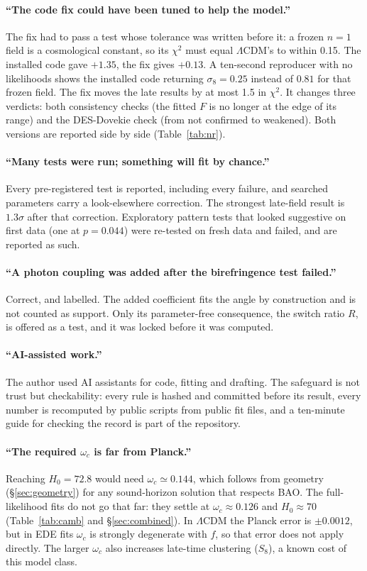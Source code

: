 \documentclass[11pt]{article}
\begin{document}
\paragraph{``The code fix could have been tuned to help the model.''} The fix had to pass a test whose tolerance was
written before it: a frozen $n=1$ field is a cosmological constant, so its $\chi^2$ must equal $\Lambda$CDM's to within
0.15. The installed code gave $+1.35$, the fix gives $+0.13$. A ten-second reproducer with no likelihoods shows the
installed code returning $\sigma_8=0.25$ instead of $0.81$ for that frozen field. The fix moves the late results by at
most 1.5 in $\chi^2$. It changes three verdicts: both consistency checks (the fitted $F$ is no longer at the edge of
its range) and the DES-Dovekie check (from not confirmed to weakened). Both versions are reported side by side
(Table~\ref{tab:nr}).

\paragraph{``Many tests were run; something will fit by chance.''} Every pre-registered test is reported, including
every failure, and searched parameters carry a look-elsewhere correction. The strongest late-field result is
$1.3\sigma$ after that correction. Exploratory pattern tests that looked suggestive on first data (one at $p=0.044$)
were re-tested on fresh data and failed, and are reported as such.

\paragraph{``A photon coupling was added after the birefringence test failed.''} Correct, and labelled. The added
coefficient fits the angle by construction and is not counted as support. Only its parameter-free consequence, the
switch ratio $R$, is offered as a test, and it was locked before it was computed.

\paragraph{``AI-assisted work.''} The author used AI assistants for code, fitting and drafting. The safeguard is
not trust but checkability: every rule is hashed and committed before its result, every number is recomputed by
public scripts from public fit files, and a ten-minute guide for checking the record is part of the repository.

\paragraph{``The required $\omega_c$ is far from Planck.''} Reaching $H_0=72.8$ would need
$\omega_c\simeq0.144$, which follows from geometry (\S\ref{sec:geometry}) for any sound-horizon
solution that respects BAO. The full-likelihood fits do not go that far: they settle at
$\omega_c\approx0.126$ and $H_0\approx70$ (Table~\ref{tab:camb} and \S\ref{sec:combined}). In $\Lambda$CDM the
Planck error is $\pm0.0012$, but in EDE fits $\omega_c$ is strongly degenerate with $f$, so that error does not
apply directly. The larger $\omega_c$ also increases late-time clustering ($S_8$), a known cost of this model class.
\end{document}
